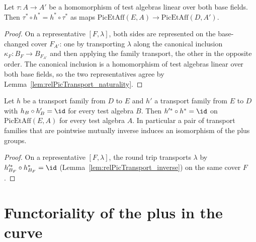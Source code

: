 \begin{theorem}
  \label{thm:PicEtAffTransport_map}
  \leanok
  Let \(\tau \colon A \to A'\) be a homomorphism of test algebras linear over both base
  fields. Then \(\tau^{*} \circ h^{*} = h^{*} \circ \tau^{*}\) as maps
  \(\mathrm{PicEtAff}(E, A) \to \mathrm{PicEtAff}(D, A')\).
\end{theorem}
\begin{proof}
  \leanok
  On a representative \([F, \lambda]\), both sides are represented on the base-changed
  cover \(F_{A'}\): one by transporting \(\lambda\) along the canonical inclusion
  \(\kappa_F \colon B_F \to B_{F_{A'}}\) and then applying the family transport, the other
  in the opposite order. The canonical inclusion is a homomorphism of test algebras linear
  over both base fields, so the two representatives agree by
  Lemma~\ref{lem:relPicTransport_naturality}.
\end{proof}

\begin{theorem}
  \label{thm:PicEtAffTransport_inverse}
  \leanok
  Let \(h\) be a transport family from \(D\) to \(E\) and \(h'\) a transport family from
  \(E\) to \(D\) with \(h_B \circ h'_B = \id\) for every test algebra \(B\). Then
  \(h'^{*} \circ h^{*} = \id\) on \(\mathrm{PicEtAff}(E, A)\) for every test algebra
  \(A\). In particular a pair of transport families that are pointwise mutually inverse
  induces an isomorphism of the plus groups.
\end{theorem}
\begin{proof}
  \leanok
  On a representative \([F, \lambda]\), the round trip transports \(\lambda\) by
  \(h'^{*}_{B_F} \circ h_{B_F}^{*} = \id\) (Lemma~\ref{lem:relPicTransport_inverse}) on the
  same cover \(F\).
\end{proof}

\section{Functoriality of the plus in the curve}

